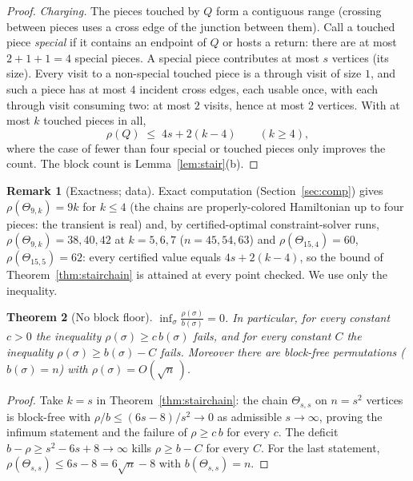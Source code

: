 \documentclass[11pt]{article}
\newtheorem{theorem}{Theorem}[section]
\theoremstyle{definition}
\newtheorem{remark}[theorem]{Remark}
\begin{document}
\begin{proof}
\emph{Charging.} The pieces touched by $Q$ form a contiguous range (crossing between
pieces uses a cross edge of the junction between them). Call a touched piece
\emph{special} if it contains an endpoint of $Q$ or hosts a return: there are at most
$2 + 1 + 1 = 4$ special pieces. A special piece contributes at most $s$ vertices (its
size). Every visit to a non-special touched piece is a through visit of size $1$, and
such a piece has at most $4$ incident cross edges, each usable once, with each through
visit consuming two: at most $2$ visits, hence at most $2$ vertices. With at most $k$
touched pieces in all,
\[
\rho(Q) \;\le\; 4s + 2(k - 4) \qquad (k \ge 4),
\]
where the case of fewer than four special or touched pieces only improves the count.
The block count is Lemma~\ref{lem:stair}(b).
\end{proof}

\begin{remark}[Exactness; data]\label{rem:stairdata}
Exact computation (Section~\ref{sec:comp}) gives $\rho(\Theta_{9,k}) = 9k$ for
$k \le 4$ (the chains are properly-colored Hamiltonian up to four pieces: the
transient is real) and, by certified-optimal constraint-solver runs,
$\rho(\Theta_{9,k}) = 38, 40, 42$ at $k = 5, 6, 7$ ($n = 45, 54, 63$) and
$\rho(\Theta_{15,4}) = 60$, $\rho(\Theta_{15,5}) = 62$: every certified value equals
$4s + 2(k-4)$, so the bound of Theorem~\ref{thm:stairchain} is attained at every point
checked. We use only the inequality.
\end{remark}

\begin{theorem}[No block floor]\label{thm:noblockfloor}
$\displaystyle \inf_{\sigma} \frac{\rho(\sigma)}{b(\sigma)} = 0$. In particular, for
every constant $c > 0$ the inequality $\rho(\sigma) \ge c\, b(\sigma)$ fails, and for
every constant $C$ the inequality $\rho(\sigma) \ge b(\sigma) - C$ fails. Moreover
there are block-free permutations ($b(\sigma) = n$) with
$\rho(\sigma) = O(\sqrt n\,)$.
\end{theorem}

\begin{proof}
Take $k = s$ in Theorem~\ref{thm:stairchain}: the chain $\Theta_{s,s}$ on $n = s^2$
vertices is block-free with
$\rho/b \le (6s - 8)/s^2 \to 0$ as admissible $s \to \infty$, proving the infimum
statement and the failure of $\rho \ge c\,b$ for every $c$. The deficit
$b - \rho \ge s^2 - 6s + 8 \to \infty$ kills $\rho \ge b - C$ for every $C$. For the
last statement, $\rho(\Theta_{s,s}) \le 6s - 8 = 6\sqrt n - 8$ with
$b(\Theta_{s,s}) = n$.
\end{proof}
\end{document}
